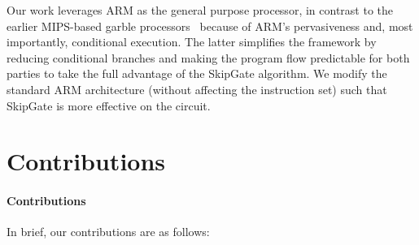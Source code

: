 Our work leverages ARM as the general purpose processor, in contrast to the earlier MIPS-based garble processors~\cite{songhori2015tinygarble, wang2015secure, songhori2016garbledcpu} because of ARM's pervasiveness and, most importantly, conditional execution.
The latter simplifies the framework by reducing conditional branches and making the program flow predictable for both parties to take the full advantage of the SkipGate algorithm.
We modify the standard ARM architecture (without affecting the instruction set) such that SkipGate is more effective on the circuit.

\section{Contributions}
\paragraph*{Contributions} In brief, our contributions are as follows:

